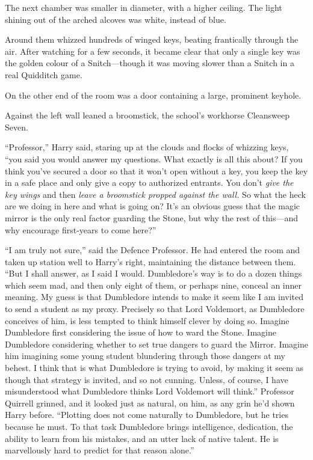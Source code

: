 \later

The next chamber was smaller in diameter, with a higher ceiling. The light shining out of the arched alcoves was white, instead of blue.

Around them whizzed hundreds of winged keys, beating frantically through the air. After watching for a few seconds, it became clear that only a single key was the golden colour of a Snitch—though it was moving slower than a Snitch in a real Quidditch game.

On the other end of the room was a door containing a large, prominent keyhole.

Against the left wall leaned a broomstick, the school’s workhorse Cleansweep Seven.

“Professor,” Harry said, staring up at the clouds and flocks of whizzing keys, “you said you would answer my questions. What exactly is all this about? If you think you’ve secured a door so that it won’t open without a key, you keep the key in a safe place and only give a copy to authorized entrants. You don’t \emph{give the key wings} and then \emph{leave a broomstick propped against the wall.} So what the heck are we doing in here and what is going on? It’s an obvious guess that the magic mirror is the only real factor guarding the Stone, but why the rest of this—and why encourage first-years to come here?”

“I am truly not sure,” said the Defence Professor. He had entered the room and taken up station well to Harry’s right, maintaining the distance between them. “But I shall answer, as I said I would. Dumbledore’s way is to do a dozen things which seem mad, and then only eight of them, or perhaps nine, conceal an inner meaning. My guess is that Dumbledore intends to make it seem like I am invited to send a student as my proxy. Precisely so that Lord Voldemort, as Dumbledore conceives of him, is less tempted to think himself clever by doing so. Imagine Dumbledore first considering the issue of how to ward the Stone. Imagine Dumbledore considering whether to set true dangers to guard the Mirror. Imagine him imagining some young student blundering through those dangers at my behest. I think that is what Dumbledore is trying to avoid, by making it seem as though that strategy is invited, and so not cunning. Unless, of course, I have misunderstood what Dumbledore thinks Lord Voldemort will think.” Professor Quirrell grinned, and it looked just as natural, on him, as any grin he’d shown Harry before. “Plotting does not come naturally to Dumbledore, but he tries because he must. To that task Dumbledore brings intelligence, dedication, the ability to learn from his mistakes, and an utter lack of native talent. He is marvellously hard to predict for that reason alone.”

